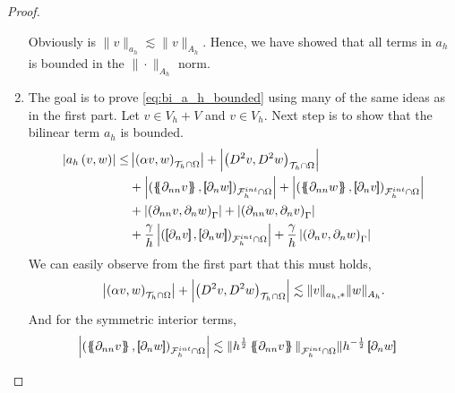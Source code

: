 \begin{proof}
\begin{enumerate}[label=\arabic*)]
             Obviously is $\| v \|_{a_{h}  }^{  } \lesssim \| v \|_{A_{h}  }^{  }$. Hence, we have showed that all terms in $a_{h}$ is bounded in the $\|\cdot   \|_{A_{h}  }^{  } $ norm.
         \item The goal is to prove \eqref{eq:bi_a_h_bounded} using many of the same ideas as in the first part. Let $v \in V_{h} +V $ and $v \in V_{h}$. Next step is to show that the bilinear term $ a_{h}$ is bounded.
                \begin{equation}
                    \begin{split}
                        \abs{ a_{h} \left( v, w \right) }   \le  &   \abs{\left( \alpha  v, w \right) _{\mathcal{T} _{h} \cap \Omega }  }    +  \abs{\left( D^2 v, D^2w \right) _{\mathcal{T} _{h} \cap \Omega}  }  \\
                                                     & + \abs{\left( \mean{  \partial _{n n} v }, \jump{ \partial _{n }w} \right)_{\mathcal{F}_{h}^{int} \cap \Omega}  }   + \abs{\left( \mean{ \partial _{nn } w }, \jump{ \partial _{n}v }
                                                     \right)_{\mathcal{F}_{h}^{int} \cap \Omega}  } \\
                                                     & + \abs{\left(  \partial _{n n} v ,  \partial _{n }w \right)_{\Gamma }}     +
                                                     \abs{\left(  \partial _{n n} w ,  \partial _{n}v       \right)_{\Gamma }  }
                                                     \\
                                                     & + \frac{\gamma }{h} \abs{ \left( \jump{ \partial _{n} v}, \jump{ \partial _{n} w   }   \right)_{\mathcal{F}_{h}^{int} \cap \Omega}  } + \frac{\gamma }{h} \abs{ \left(  \partial _{n} v,  \partial _{n} w
                                                     \right)_{\Gamma }  }
                    \end{split}
                \end{equation}
                     We can easily observe from the first part that this must holds, \[
    \left\lvert \left( \alpha  v, w \right) _{\mathcal{T} _{h} \cap \Omega }   \right\rvert    +  \left\lvert \left( D^2 v, D^2w \right) _{\mathcal{T} _{h} \cap \Omega}   \right\rvert \lesssim \| v \|_{ a_{h},* }^{  } \| w \|_{A_{h}  }^{  }.
    \]
    And for the symmetric interior terms,
    \[
        \begin{split}
            \abs{\left( \mean{  \partial _{n n} v }, \jump{ \partial _{n }w} \right)_{\mathcal{F}_{h}^{int} \cap \Omega}  } &\lesssim \| h^{\frac{1}{2}}\mean{ \partial _{nn}v }   \|_{ \mathcal{F}_{h}^{int} \cap \Omega  }^{  } \| h^{-\frac{1}{2}}\jump{ \partial _{n }w}

\end{split}\]
\end{enumerate}
\end{proof}
